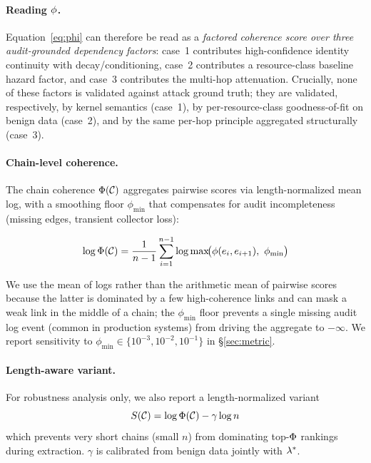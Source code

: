 \paragraph{Reading $\phi$.} Equation~\ref{eq:phi} can therefore be read as a \emph{factored coherence score over three audit-grounded dependency factors}: case~1 contributes high-confidence identity continuity with decay/conditioning, case~2 contributes a resource-class baseline hazard factor, and case~3 contributes the multi-hop attenuation. Crucially, none of these factors is validated against attack ground truth; they are validated, respectively, by kernel semantics (case~1), by per-resource-class goodness-of-fit on benign data (case~2), and by the same per-hop principle aggregated structurally (case~3).

\paragraph{Chain-level coherence.} The chain coherence $\Phi(\mathcal{C})$ aggregates pairwise scores via length-normalized mean log, with a smoothing floor $\phi_{\min}$ that compensates for audit incompleteness (missing edges, transient collector loss):

\begin{equation}
\log \Phi(\mathcal{C}) = \frac{1}{n-1} \sum_{i=1}^{n-1} \log \max\!\bigl(\phi(e_i, e_{i+1}),\ \phi_{\min}\bigr)
\label{eq:chain_phi}
\end{equation}

We use the mean of logs rather than the arithmetic mean of pairwise scores because the latter is dominated by a few high-coherence links and can mask a weak link in the middle of a chain; the $\phi_{\min}$ floor prevents a single missing audit log event (common in production systems) from driving the aggregate to $-\infty$. We report sensitivity to $\phi_{\min} \in \{10^{-3}, 10^{-2}, 10^{-1}\}$ in \S\ref{sec:metric}.

\paragraph{Length-aware variant.} For robustness analysis only, we also report a length-normalized variant
\begin{equation}
S(\mathcal{C}) = \log \Phi(\mathcal{C}) - \gamma \log n
\label{eq:phi_length}
\end{equation}
which prevents very short chains (small $n$) from dominating top-$\Phi$ rankings during extraction. $\gamma$ is calibrated from benign data jointly with $\lambda^*$.

